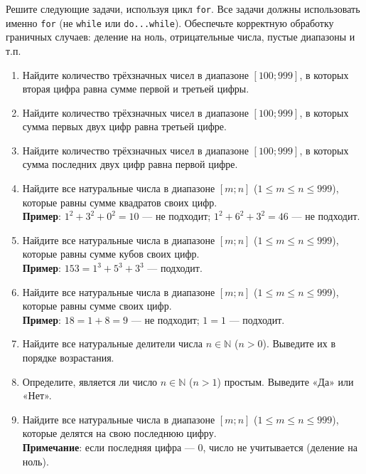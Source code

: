 \documentclass[12pt]{article}
\begin{document}
Решите следующие задачи, используя цикл \texttt{for}. Все задачи должны использовать именно \texttt{for} (не \texttt{while} или \texttt{do...while}). Обеспечьте корректную обработку граничных случаев: деление на ноль, отрицательные числа, пустые диапазоны и т.п.

\begin{enumerate}
    \item Найдите количество трёхзначных чисел в диапазоне $[100; 999]$, в которых вторая цифра равна сумме первой и третьей цифры.

    \item Найдите количество трёхзначных чисел в диапазоне $[100; 999]$, в которых сумма первых двух цифр равна третьей цифре.

    \item Найдите количество трёхзначных чисел в диапазоне $[100; 999]$, в которых сумма последних двух цифр равна первой цифре.

    \item Найдите все натуральные числа в диапазоне $[m; n]$ ($1 \leqslant m \leqslant n \leqslant 999$), которые равны сумме квадратов своих цифр. \\
    \textbf{Пример}: $1^2 + 3^2 + 0^2 = 10$ — не подходит; $1^2 + 6^2 + 3^2 = 46$ — не подходит.

    \item Найдите все натуральные числа в диапазоне $[m; n]$ ($1 \leqslant m \leqslant n \leqslant 999$), которые равны сумме кубов своих цифр. \\
    \textbf{Пример}: $153 = 1^3 + 5^3 + 3^3$ — подходит.

    \item Найдите все натуральные числа в диапазоне $[m; n]$ ($1 \leqslant m \leqslant n \leqslant 999$), которые равны сумме своих цифр. \\
    \textbf{Пример}: $18 = 1 + 8 = 9$ — не подходит; $1 = 1$ — подходит.

    \item Найдите все натуральные делители числа $n \in \mathbb{N}$ ($n > 0$). Выведите их в порядке возрастания.

    \item Определите, является ли число $n \in \mathbb{N}$ ($n > 1$) простым. Выведите «Да» или «Нет».

    \item Найдите все натуральные числа в диапазоне $[m; n]$ ($1 \leqslant m \leqslant n \leqslant 999$), которые делятся на свою последнюю цифру. \\
    \textbf{Примечание}: если последняя цифра — 0, число не учитывается (деление на ноль).


\end{enumerate}
\end{document}
